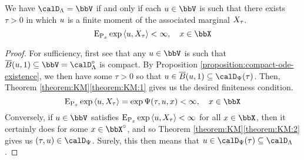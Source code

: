 \begin{proposition}
  \label{proposition:light-tails-equivalence}
  We have $\odeSpace = \vecSpace$ if and only if each $\momentVar \in \vecSpace$ is such that there exists $\tau > 0$ in which $u$ is a finite moment of the associated marginal $X_\tau$.
  \begin{equation*}
    \Exp_{\Prb_\stateVar}\exp\prj{\momentVar}{\X_\tau} < \infty, \quad \stateVar \in \stateSpace
  \end{equation*}
\end{proposition}
\begin{proof}
  \label{proof:proposition:light-tails-equivalence}
  For sufficiency, first see that any $\momentVar \in \vecSpace$ is such that $\closedBall{\momentVar}{1} \subseteq \vecSpace = \odeSpace^\circ$ is compact.
  By Proposition \ref{proposition:compact-ode-existence}, we then have some $\tau > 0$ so that $\momentVar \in \closedBall{\momentVar}{1} \subseteq \momentSpace(\tau)$.
  Then, Theorem \ref{theorem:KM}\ref{theorem:KM:1} gives us the desired finiteness condition.
  \begin{equation*}
    \Exp_{\Prb_\stateVar}\exp\prj{\momentVar}{\X_\tau} = \exp\aff(\tau, \momentVar, \stateVar) < \infty, \quad \stateVar \in \stateSpace
  \end{equation*}
  Conversely, if $\momentVar \in \vecSpace$ satisfies ${\operatorname{E}}_{{\operatorname{P}}_x}\exp{\langle u, X_\tau \rangle} < \infty$ for all $\stateVar \in \stateSpace$, then it certainly does for some $\stateVar \in \stateSpace^\circ$, and so Theorem \ref{theorem:KM}\ref{theorem:KM:2} gives us $(\tau, \momentVar) \in \momentSpace$.
  Surely, this then means that $\momentVar \in \momentSpace(\tau) \subseteq \odeSpace$.
\end{proof}
